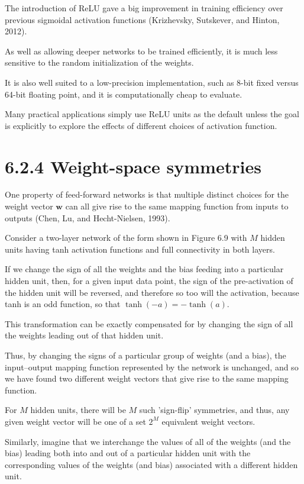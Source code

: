 \documentclass{article}
\begin{document}
The introduction of ReLU gave a big improvement in training efficiency over previous sigmoidal activation functions (Krizhevsky, Sutskever, and Hinton, 2012). 

As well as allowing deeper networks to be trained efficiently, it is much less sensitive to the random initialization of the weights. 

It is also well suited to a low-precision implementation, such as 8-bit fixed versus 64-bit floating point, and it is computationally cheap to evaluate. 

Many practical applications simply use ReLU units as the default unless the goal is explicitly to explore the effects of different choices of activation function.


\section{6.2.4 Weight-space symmetries}

One property of feed-forward networks is that multiple distinct choices for the weight vector $\mathbf{w}$ can all give rise to the same mapping function from inputs to outputs (Chen, Lu, and Hecht-Nielsen, 1993). 

Consider a two-layer network of the form shown in Figure 6.9 with $M$ hidden units having tanh activation functions and full connectivity in both layers. 

If we change the sign of all the weights and the bias feeding into a particular hidden unit, then, for a given input data point, the sign of the pre-activation of the hidden unit will be reversed, and therefore so too will the activation, because tanh is an odd function, so that $\tanh(-a) = -\tanh(a)$. 

This transformation can be exactly compensated for by changing the sign of all the weights leading out of that hidden unit. 

Thus, by changing the signs of a particular group of weights (and a bias), the input–output mapping function represented by the network is unchanged, and so we have found two different weight vectors that give rise to the same mapping function. 

For $M$ hidden units, there will be $M$ such 'sign-flip' symmetries, and thus, any given weight vector will be one of a set $2^M$ equivalent weight vectors.

Similarly, imagine that we interchange the values of all of the weights (and the bias) leading both into and out of a particular hidden unit with the corresponding values of the weights (and bias) associated with a different hidden unit. 
\end{document}
